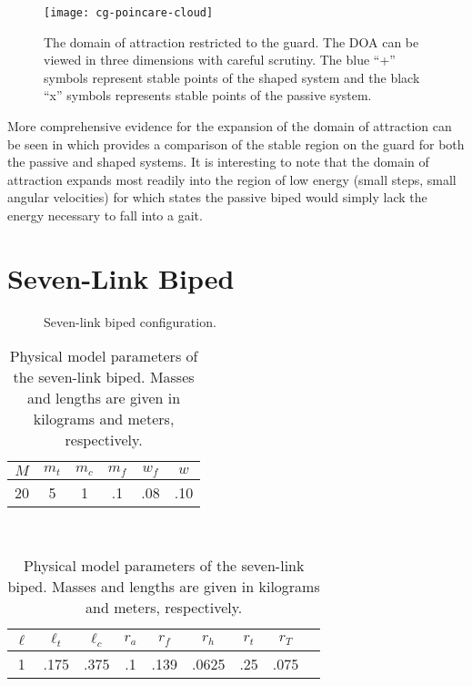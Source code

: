 \begin{figure}[t!]
  \centering
  \centering
  \texttt{[image: cg-poincare-cloud]}
  \caption[The domain of attraction restricted to the guard.]{The domain of
    attraction restricted to the guard.
    The DOA can be viewed in three dimensions with careful scrutiny.
    The blue ``+'' symbols represent stable points of the shaped system and the
    black ``x'' symbols represents stable points of the passive system.}
  \label{fig:point-cloud}
  \vspace{-1em}
\end{figure}

More comprehensive evidence for the expansion of the domain of attraction can be
seen in  which provides a comparison of the stable
region on the guard for both the passive and shaped systems.
% 
It is interesting to note that the domain of attraction expands most readily
into the region of low energy (small steps, small angular velocities) for which
states the passive biped would simply lack the energy necessary to fall into a
gait.

\section{Seven-Link Biped}

\begin{figure}
  \centering
  \def\svgwidth{0.5\columnwidth}
  
  \caption{Seven-link biped configuration.}
\end{figure}

\begin{table}[t!]
  \begin{center}
    \caption[Physical model parameters of the seven-link biped.]{Physical model
      parameters of the seven-link biped. Masses and lengths are given in
      kilograms and meters, respectively.}
    \label{tab:reduction:model-parameters}
    \begin{tabular}{|c|c|c|c|c|c|}
      \hline
      $M$ & $m_{t}$ & $m_{c}$ &
      $m_{f}$ & $w_{f}$ & $w$\\
      \hline
      20 & 5 & 1 & .1 & .08 & .10 \\
      \hline
    \end{tabular}\\[.1em]
    \begin{tabular}{|c|c|c|c|c|c|c|c|c|}
      \hline
      $\ell$ & $\ell_{t}$ & $\ell_{c}$ &
      $r_{a}$ & $r_{f}$ & $r_{h}$ & $r_{t}$ & $r_{T} $\\
      \hline
      1 & .175 & .375 & .1 & .139 & .0625 & .25 & .075\\
      \hline
    \end{tabular}
  \end{center}
\end{table}


